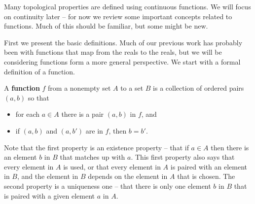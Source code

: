 \label{chap:functions}


\vspace*{-17 pt}

\vspace*{13 pt}

\label{sec_func_intro}

Many topological properties are defined using continuous functions. We will focus on continuity later -- for now we review some important concepts related to functions. Much of this should be familiar, but some might be new. 

First we present the basic definitions. Much of our previous work has probably been with functions that map from the reals to the reals, but we will be considering functions form a more general perspective. We start with a formal definition of a function. 

\begin{definition} \label{def:function} A \textbf{function} $f$ from a nonempty set $A$ to a set $B$ is a collection of ordered pairs $(a,b)$ so that 
\begin{itemize}
\item for each $a \in A$ there is a pair $(a,b)$ in $f$, and 
\item if $(a,b)$ and $(a,b')$ are in $f$, then $b=b'$.  
\end{itemize}
\end{definition}

Note that the first property is an existence property -- that if $a \in A$ then there is an element $b$ in $B$ that matches up with $a$. This first property also says that every element in $A$ is used, or that every element in $A$ is paired with an element in $B$, and the element in $B$ depends on the element in $A$ that is chosen. The second property is a uniqueness one -- that there is only one element $b$ in $B$ that is paired with a given element $a$ in $A$. 


